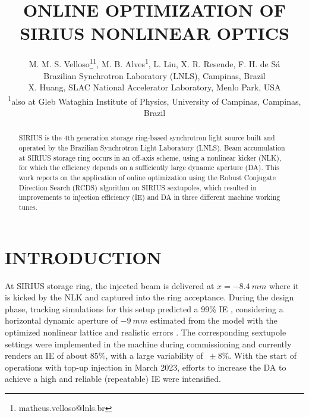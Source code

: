 \documentclass[a4paper,
               keeplastbox,   %
               ]{jacow}
\begin{document}
\title{ONLINE OPTIMIZATION OF SIRIUS NONLINEAR OPTICS}

\author{M. M. S. Velloso\thanks{matheus.velloso@lnls.br}\textsuperscript{1}, M. B. Alves\textsuperscript{1}, L. Liu, X. R. Resende, F. H. de Sá\\ Brazilian Synchrotron Laboratory (LNLS), Campinas, Brazil \\
		X. Huang, SLAC National Accelerator Laboratory, Menlo Park, USA \\
		\textsuperscript{1}also at Gleb Wataghin Institute of Physics, University of Campinas, Campinas, Brazil 
}
	
\maketitle
%
\begin{abstract}
SIRIUS is the 4th generation storage ring-based synchrotron light source built and operated by the Brazilian Synchrotron Light Laboratory (LNLS). Beam accumulation at SIRIUS storage ring occurs in an off-axis scheme, using a nonlinear kicker (NLK), for which the efficiency depends on a sufficiently large dynamic aperture (DA). 
This work reports on the application of online optimization using the Robust Conjugate Direction Search (RCDS) algorithm on SIRIUS sextupoles, which resulted in improvements to injection efficiency (IE) and DA in three different machine working tunes. 
\end{abstract}

\section{INTRODUCTION}
At SIRIUS storage ring, the injected beam is delivered at $x=-8.4~\unit{mm}$ where it is kicked by the NLK and captured into the ring acceptance. During the design phase, tracking simulations for this setup predicted a 99\% IE \cite{Liu:IPAC2016-THPMR011}, considering a horizontal dynamic aperture of $-9~\unit{mm}$  estimated from the model with the optimized nonlinear lattice and realistic errors \cite{deSá:IPAC2016-THPMR012}.  The corresponding sextupole settings were implemented in the machine during commissioning and currently renders an IE of about 85\%, with a large variability of $~\pm8\%$. With the start of operations with top-up injection in March 2023, efforts to increase the DA to achieve a high and reliable (repeatable) IE were intensified. 
\end{document}
